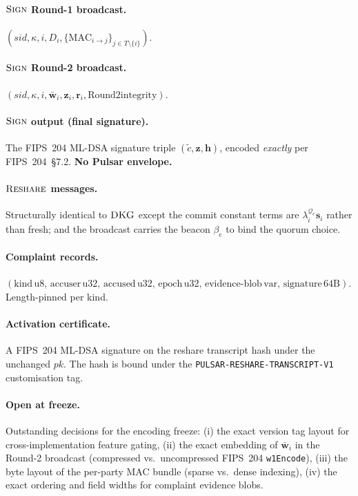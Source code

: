 \documentclass[11pt,a4paper]{article}
\theoremstyle{definition}
\theoremstyle{remark}
\newcommand{\Sign}{\textsc{Sign}}
\newcommand{\DKG}{\textsc{DKG}}
\newcommand{\Reshare}{\textsc{Reshare}}
\begin{document}
\paragraph{$\Sign$ Round-1 broadcast.}
$(\mathit{sid}, \kappa, i, D_i, \{\mathrm{MAC}_{i \to j}\}_{j \in T \setminus \{i\}})$.

\paragraph{$\Sign$ Round-2 broadcast.}
$(\mathit{sid}, \kappa, i, \bar{\mathbf{w}}_i, \mathbf{z}_i, \mathbf{r}_i, \text{Round2integrity})$.

\paragraph{$\Sign$ output (final signature).}
The FIPS~204 ML-DSA signature triple $(\tilde c, \mathbf{z}, \mathbf{h})$,
encoded \emph{exactly} per FIPS~204~\S7.2. \textbf{No Pulsar envelope.}

\paragraph{$\Reshare$ messages.}
Structurally identical to $\DKG$ except the commit constant terms
are $\lambda_i^{\mathcal{Q}_e} \mathbf{s}_i$ rather than fresh; and the
broadcast carries the beacon $\beta_e$ to bind the quorum choice.

\paragraph{Complaint records.}
$(\text{kind}\,\text{u8},\,\text{accuser}\,\text{u32},\,\text{accused}\,\text{u32},\,\text{epoch}\,\text{u32},\,\text{evidence-blob}\,\text{var},\,\text{signature}\,\text{64B})$.
Length-pinned per kind.

\paragraph{Activation certificate.}
A FIPS~204 ML-DSA signature on the reshare transcript hash under the
unchanged $\mathit{pk}$. The hash is bound under the
\texttt{PULSAR-RESHARE-TRANSCRIPT-V1} customisation tag.

\paragraph{Open at freeze.}
Outstanding decisions for the encoding freeze:
(i) the exact version tag layout for cross-implementation feature
gating,
(ii) the exact embedding of $\bar{\mathbf{w}}_i$ in the Round-2
broadcast (compressed vs.\ uncompressed FIPS~204
\texttt{w1Encode}),
(iii) the byte layout of the per-party MAC bundle (sparse vs.\
dense indexing),
(iv) the exact ordering and field widths for complaint evidence blobs.
\end{document}
